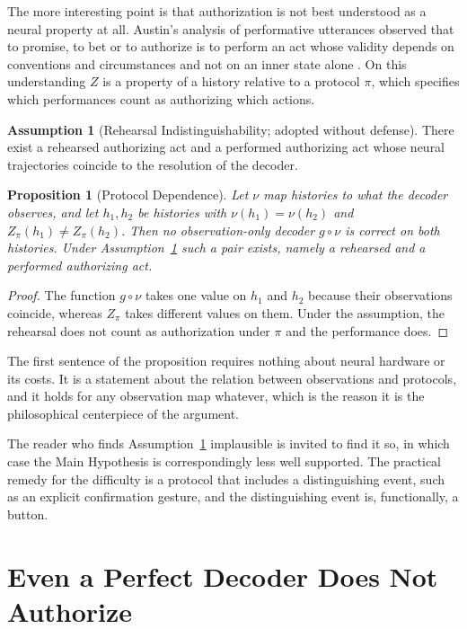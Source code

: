 \documentclass[11pt,twoside,openany]{book}
\newtheorem{proposition}[theorem]{Proposition}
\theoremstyle{definition}
\newtheorem{assumption}[theorem]{Assumption}
\theoremstyle{remark}
\begin{document}
The more interesting point is that authorization is not best understood as a neural property at all. Austin's analysis of performative utterances observed that to promise, to bet or to authorize is to perform an act whose validity depends on conventions and circumstances and not on an inner state alone \cite{austin1962}. On this understanding $Z$ is a property of a history relative to a protocol $\pi$, which specifies which performances count as authorizing which actions.

\begin{assumption}[Rehearsal Indistinguishability; adopted without defense]\label{as:rehearsal}
There exist a rehearsed authorizing act and a performed authorizing act whose neural trajectories coincide to the resolution of the decoder.
\end{assumption}

\begin{proposition}[Protocol Dependence]\label{prop:protocol}
Let $\nu$ map histories to what the decoder observes, and let $h_1,h_2$ be histories with $\nu(h_1)=\nu(h_2)$ and $Z_\pi(h_1)\neq Z_\pi(h_2)$. Then no observation-only decoder $g\circ\nu$ is correct on both histories. Under Assumption~\ref{as:rehearsal} such a pair exists, namely a rehearsed and a performed authorizing act.
\end{proposition}
\begin{proof}
The function $g\circ\nu$ takes one value on $h_1$ and $h_2$ because their observations coincide, whereas $Z_\pi$ takes different values on them. Under the assumption, the rehearsal does not count as authorization under $\pi$ and the performance does.
\end{proof}

The first sentence of the proposition requires nothing about neural hardware or its costs. It is a statement about the relation between observations and protocols, and it holds for any observation map whatever, which is the reason it is the philosophical centerpiece of the argument.

The reader who finds Assumption~\ref{as:rehearsal} implausible is invited to find it so, in which case the Main Hypothesis is correspondingly less well supported. The practical remedy for the difficulty is a protocol that includes a distinguishing event, such as an explicit confirmation gesture, and the distinguishing event is, functionally, a button.

\section{Even a Perfect Decoder Does Not Authorize}
\end{document}
